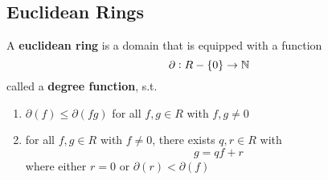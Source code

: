 \documentclass[11pt]{article}
\begin{document}
\subsection{Euclidean Rings}
\label{sec:org0c364bb}
 
\begin{definition}[]
A \textbf{euclidean ring} is a domain that is equipped with a function
\begin{equation*}
\partial:R-\{0\}\to\mathbb{N}
\end{equation*}
called a \textbf{degree function}, s.t.
\begin{enumerate}
\item \(\partial(f)\le\partial(fg)\) for all \(f,g\in R\) with \(f,g\neq0\)
\item for all \(f,g\in R\) with \(f\neq0\), there exists \(q,r\in R\) with
\begin{equation*}
g=qf+r
\end{equation*}
where either \(r=0\) or \(\partial(r)<\partial(f)\)
\end{enumerate}
\end{definition}
\end{document}
